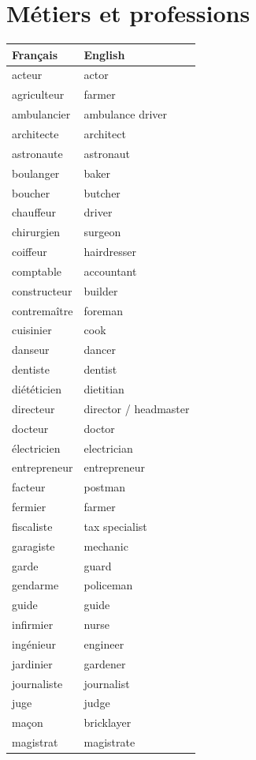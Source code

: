 \documentclass[12pt,a4paper]{article}
\begin{document}
\newpage

\section{Métiers et professions}
\begin{longtable}{p{4cm} p{6cm}}
\toprule
\textbf{Français} & \textbf{English} \\
\midrule
acteur & actor \\
agriculteur & farmer \\
ambulancier & ambulance driver \\
architecte & architect \\
astronaute & astronaut \\
boulanger & baker \\
boucher & butcher \\
chauffeur & driver \\
chirurgien & surgeon \\
coiffeur & hairdresser \\
comptable & accountant \\
constructeur & builder \\
contremaître & foreman \\
cuisinier & cook \\
danseur & dancer \\
dentiste & dentist \\
diététicien & dietitian \\
directeur & director / headmaster \\
docteur & doctor \\
électricien & electrician \\
entrepreneur & entrepreneur \\
facteur & postman \\
fermier & farmer \\
fiscaliste & tax specialist \\
garagiste & mechanic \\
garde & guard \\
gendarme & policeman \\
guide & guide \\
infirmier & nurse \\
ingénieur & engineer \\
jardinier & gardener \\
journaliste & journalist \\
juge & judge \\
maçon & bricklayer \\
magistrat & magistrate \\

\end{longtable}
\end{document}
